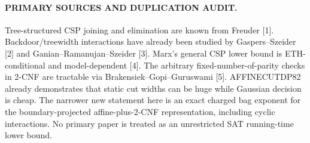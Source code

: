 \documentclass[11pt]{article}
\begin{document}
\paragraph{PRIMARY SOURCES AND DUPLICATION AUDIT.} Tree-structured CSP joining and elimination are known from Freuder [1]. Backdoor/treewidth interactions have already been studied by Gaspers--Szeider [2] and Ganian--Ramanujan--Szeider [3]. Marx's general CSP lower bound is ETH-conditional and model-dependent [4]. The arbitrary fixed-number-of-parity checks in 2-CNF are tractable via Brakensiek--Gopi--Guruswami [5]. AFFINECUTDP82 already demonstrates that static cut widths can be huge while Gaussian decision is cheap. The narrower new statement here is an exact charged bag exponent for the boundary-projected affine-plus-2-CNF representation, including cyclic interactions. No primary paper is treated as an unrestricted SAT running-time lower bound.
\end{document}
